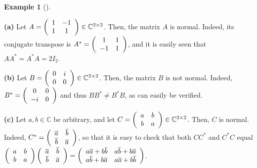 \documentclass[numbers=enddot,12pt,final,onecolumn,notitlepage]{scrartcl}%
\numberwithin{exer}{subsection}
\theoremstyle{definition}
\newtheorem{exam}[theo]{Example}
\newenvironment{example}[1][]
{\begin{exam}[#1]\begin{leftbar}}
{\end{leftbar}\end{exam}}
\begin{document}
\begin{example}
\textbf{(a)} Let $A=\left(
\begin{array}
[c]{cc}%
1 & -1\\
1 & 1
\end{array}
\right)  \in\mathbb{C}^{2\times2}$. Then, the matrix $A$ is normal. Indeed,
its conjugate transpose is $A^{\ast}=\left(
\begin{array}
[c]{cc}%
1 & 1\\
-1 & 1
\end{array}
\right)  $, and it is easily seen that $AA^{\ast}=A^{\ast}A=2I_{2}$. \medskip

\textbf{(b)} Let $B=\left(
\begin{array}
[c]{cc}%
0 & i\\
0 & 0
\end{array}
\right)  \in\mathbb{C}^{2\times2}$. Then, the matrix $B$ is not normal.
Indeed, $B^{\ast}=\left(
\begin{array}
[c]{cc}%
0 & 0\\
-i & 0
\end{array}
\right)  $ and thus $BB^{\ast}\neq B^{\ast}B$, as can easily be verified.
\medskip

\textbf{(c)} Let $a,b\in\mathbb{C}$ be arbitrary, and let $C=\left(
\begin{array}
[c]{cc}%
a & b\\
b & a
\end{array}
\right)  \in\mathbb{C}^{2\times2}$. Then, $C$ is normal. Indeed, $C^{\ast
}=\left(
\begin{array}
[c]{cc}%
\overline{a} & \overline{b}\\
\overline{b} & \overline{a}%
\end{array}
\right)  $, so that it is easy to check that both $CC^{\ast}$ and $C^{\ast}C$
equal $\left(
\begin{array}
[c]{cc}%
a & b\\
b & a
\end{array}
\right)  \left(
\begin{array}
[c]{cc}%
\overline{a} & \overline{b}\\
\overline{b} & \overline{a}%
\end{array}
\right)  =\left(
\begin{array}
[c]{cc}%
a\overline{a}+b\overline{b} & a\overline{b}+b\overline{a}\\
a\overline{b}+b\overline{a} & a\overline{a}+b\overline{b}%
\end{array}
\right)  $.
\end{example}
\end{document}
